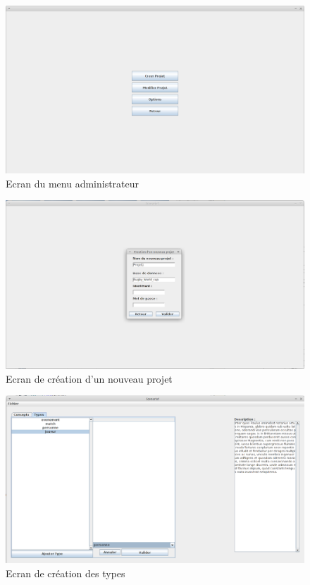 \documentclass[12pt]{report}
\begin{document}
\begin{figure}
\centering
\includegraphics[scale=0.3]{IHM/selection_projet.png}
\caption{Ecran du menu administrateur}
\end{figure}

\begin{figure}
\centering
\includegraphics[scale=0.3]{IHM/creation_projet.png}
\caption{Ecran de création d'un nouveau projet}
\end{figure}

\begin{figure}
\centering
\includegraphics[scale=0.3]{IHM/creation_types.png}
\caption{Ecran de création des types}
\end{figure}
\end{document}
